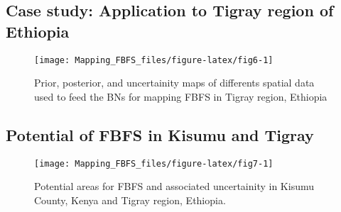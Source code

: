 \documentclass[12pt,oneside]{article}
\begin{document}
\hypertarget{case-study-application-to-tigray-region-of-ethiopia}{%
\subsection{Case study: Application to Tigray region of Ethiopia}\label{case-study-application-to-tigray-region-of-ethiopia}}

\begin{figure}[!htbp]

{\centering \texttt{[image: Mapping\_FBFS\_files/figure-latex/fig6-1]} 

}

\caption{Prior, posterior, and uncertainity maps of differents spatial data used to feed the BNs for mapping FBFS in Tigray region, Ethiopia}\label{fig:fig6}
\end{figure}

\hypertarget{potential-of-fbfs-in-kisumu-and-tigray}{%
\subsection{Potential of FBFS in Kisumu and Tigray}\label{potential-of-fbfs-in-kisumu-and-tigray}}

\begin{figure}[!htbp]

{\centering \texttt{[image: Mapping\_FBFS\_files/figure-latex/fig7-1]} 

}

\caption{Potential areas for FBFS and associated uncertainity in Kisumu County, Kenya and Tigray region, Ethiopia.}\label{fig:fig7}
\end{figure}

\begin{table}[t]

\caption{\label{tab:table3}Spatial coverage of FBFS in Kisumu County, Kenya and Tigray region, Ethiopia.}
\centering
{}
\end{table}
\end{document}
